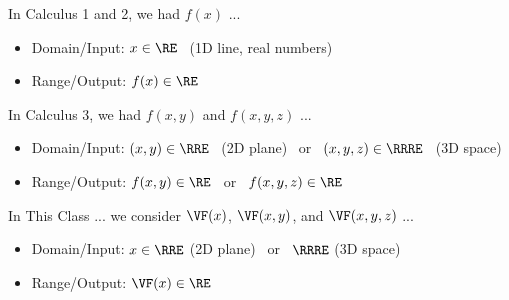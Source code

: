\begin{frame}

	In Calculus 1 and 2, we had $f(x)$ ...

		\begin{itemize}
			\item Domain/Input: \quad $x \in \RE$ \, (1D line, real numbers)
			\item Range/Output: \quad $f(x) \in \RE$
		\end{itemize}

		\smallskip

		In Calculus 3, we had $f(x,y)$ and $f(x,y,z)$ ... 

		\begin{itemize}
			\item Domain/Input: \quad $(x,y) \in \RRE$ \, (2D plane) \, or \, $(x,y,z) \in \RRRE$ \, (3D space)
			\item Range/Output: \quad $f(x,y) \in \RE$ \, or \, $f(x,y,z) \in \RE$
		\end{itemize}

		\smallskip

		In This Class ... we consider $\VF(x)$, $\VF(x,y)$, and $\VF(x,y,z)$ ... 

		\begin{itemize}
			\item Domain/Input: \quad $x \in \RRE$ (2D plane) \, or \, $\RRRE$ (3D space)
			\item Range/Output: \quad $\VF(x) \in \RE$
		\end{itemize}

\end{frame}

